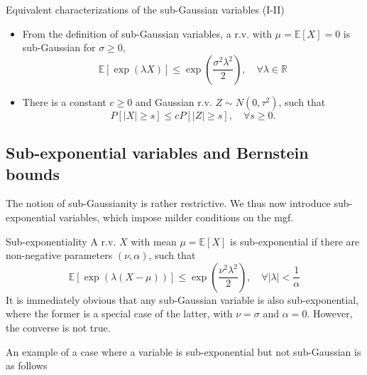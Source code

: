\documentclass[10pt,handout,english]{beamer}
\newcommand{\E}{\mathbb{E}}
\newcommand{\R}{\mathbb{R}}
\begin{document}
\begin{frame}
\begin{block}{Equivalent characterizations of the sub-Gaussian variables (I-II)}
\begin{itemize}
\item[(I)] From the definition of sub-Gaussian variables, a r.v. with $\mu=\E[X]=0$ is sub-Gaussian for $\sigma\geq 0$,
\[
\E[\exp(\lambda X)]\leq\exp\left(\frac{\sigma^2\lambda^2}{2}\right),\quad\forall\lambda\in\R
\]
\item[(II)] There is a constant $c\geq 0$ and Gaussian r.v. $Z\sim N(0,\tau^2)$, such that
\[
P[\lvert X\rvert\geq s]\leq cP[\lvert Z\rvert\geq s],\quad\forall s\geq0.
\]
\end{itemize}
\end{block}
\end{frame}
\subsection{Sub-exponential variables and Bernstein bounds}
\begin{frame}
The notion of sub-Gaussianity is rather restrictive. We thus now introduce sub-exponential variables, which impose milder conditions on the mgf.
\begin{definition}{Sub-exponentiality}
A r.v. $X$ with mean $\mu=\E[X]$ is sub-exponential if there are non-negative parameters $(\nu,\alpha)$, such that
\[
\E[\exp(\lambda(X-\mu))]\leq\exp\left(\frac{\nu^2\lambda^2}{2}\right),\quad\forall \lvert\lambda\rvert<\frac{1}{\alpha}
\]
It is immediately obvious that any sub-Gaussian variable is also sub-exponential, where the former is a special case of the latter, with $\nu=\sigma$ and $\alpha=0$. However, the converse is not true. 
\end{definition}
An example of a case where a variable is sub-exponential but not sub-Gaussian is as follows
\end{frame}
\end{document}
